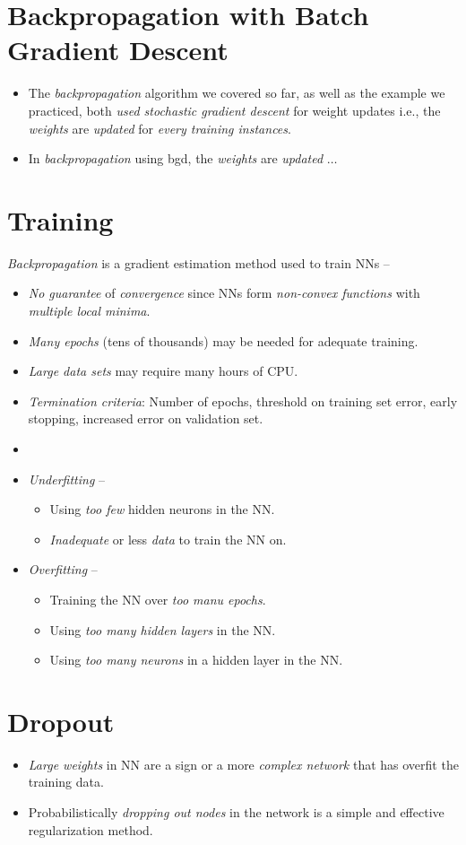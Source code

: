 \documentclass[
	number={8},
	title={Artificial Neural Network}
]{cs584notes}
\begin{document}
\section{Backpropagation with Batch Gradient Descent}\label{sec:backpropagation-with-batch-gradient-descent}
\begin{itemize}
	\item The \emph{backpropagation} algorithm we covered so far, as well as the example we practiced, both \emph{used stochastic gradient descent} for weight updates i.e., the \emph{weights} are \emph{updated} for \emph{every training instances}.
	\item In \emph{backpropagation} using bgd, the \emph{weights} are \emph{updated} $\dots$
\end{itemize}

\section{Training}\label{sec:training}
\emph{Backpropagation} is a gradient estimation method used to train NNs --
\begin{itemize}
	\item \emph{No guarantee} of \emph{convergence} since NNs form \emph{non-convex functions} with \emph{multiple local minima}.
	\item \emph{Many epochs} (tens of thousands) may be needed for adequate training.
	\item \emph{Large data sets} may require many hours of CPU\@.
	\item \emph{Termination criteria}: Number of epochs, threshold on training set error, early stopping, increased error on validation set.
	\item
	\item \emph{Underfitting} --
	\begin{itemize}
		\item Using \emph{too few} hidden neurons in the NN\@.
		\item \emph{Inadequate} or less \emph{data} to train the NN on.
	\end{itemize}
	\item \emph{Overfitting} --
	\begin{itemize}
		\item Training the NN over \emph{too manu epochs}.
		\item Using \emph{too many hidden layers} in the NN\@.
		\item Using \emph{too many neurons} in a hidden layer in the NN\@.
	\end{itemize}
\end{itemize}

\section{Dropout}\label{sec:dropout}
\begin{itemize}
	\item \emph{Large weights} in NN are a sign or a more \emph{complex network} that has overfit the training data.
	\item Probabilistically \emph{dropping out nodes} in the network is a simple and effective regularization method.
\end{itemize}
\end{document}
